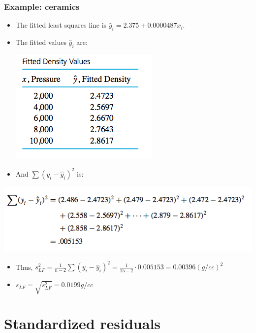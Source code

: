 \documentclass[handout]{beamer}\usepackage{graphicx, color}
\providecommand{\wh}[1]{\widehat{#1}}
\numberwithin{equation}{section}
\begin{document}
\begin{frame}
\frametitle{Example: ceramics} \scriptsize
\begin{itemize}
\item The fitted least squares line is $\wh{y}_i = 2.375 + 0.0000487 x_i$.
\pause \item The fitted values $\wh{y}_i$ are:
\begin{center}
 \includegraphics{../../fig/ceramicsfit.png}
\end{center}
\pause \item And $\sum (y_i - \wh{y}_i)^2$ is:
\end{itemize}
\begin{center}
 \includegraphics{../../fig/ceramicsyyhat.png}
\end{center}
\begin{itemize}
\pause \item Thus, $s^2_{LF} = \frac{1}{n-2} \sum (y_i - \wh{y}_i)^2 = \frac{1}{15 - 2} \cdot 0.005153 = 0.00396 (g/cc)^2$
\pause \item $s_{LF} = \sqrt{s^2_{LF}} = 0.0199 g/cc$
\end{itemize}
\end{frame}

\section{Standardized residuals}
\end{document}
